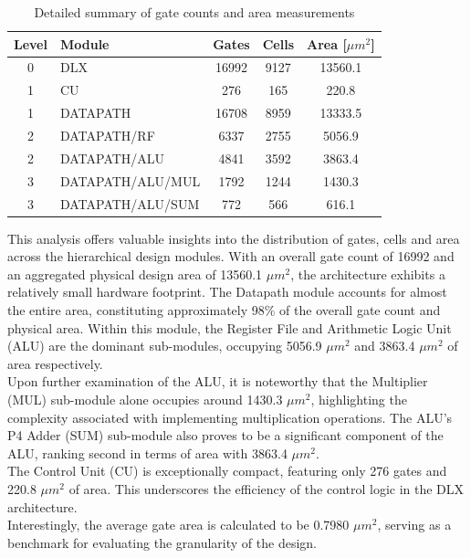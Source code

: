 \begin{table}[!htbp]
	\centering
	\begin{tabular}{clccc}
		\toprule
		Level & Module & Gates & Cells & Area [$\mu m^2$] \\
		\midrule
		0 & DLX & 16992 & 9127 & 13560.1 \\
		1 & CU & 276 & 165 & 220.8 \\
		1 & DATAPATH & 16708 & 8959 & 13333.5 \\
		2 & DATAPATH/RF & 6337 & 2755 & 5056.9 \\
		2 & DATAPATH/ALU & 4841 & 3592 & 3863.4 \\
		3 & DATAPATH/ALU/MUL & 1792 & 1244 & 1430.3 \\
		3 & DATAPATH/ALU/SUM & 772 & 566 & 616.1 \\
		\bottomrule
	\end{tabular}
	\caption{Detailed summary of gate counts and area measurements}
	\label{tab:phy_results}
\end{table}

This analysis offers valuable insights into the distribution of gates, cells and area across the hierarchical design modules. With an overall gate count of 16992 and an aggregated physical design area of 13560.1 $\mu m^2$, the architecture exhibits a relatively small hardware footprint. The Datapath module accounts for almost the entire area, constituting approximately 98\% of the overall gate count and physical area. Within this module, the Register File and Arithmetic Logic Unit (ALU) are the dominant sub-modules, occupying 5056.9 $\mu m^2$ and 3863.4 $\mu m^2$ of area respectively. \\

Upon further examination of the ALU, it is noteworthy that the Multiplier (MUL) sub-module alone occupies around 1430.3 $\mu m^2$, highlighting the complexity associated with implementing multiplication operations. The ALU's P4 Adder (SUM) sub-module also proves to be a significant component of the ALU, ranking second in terms of area with 3863.4 $\mu m^2$. \\

The Control Unit (CU) is exceptionally compact, featuring only 276 gates and 220.8 $\mu m^2$ of area. This underscores the efficiency of the control logic in the DLX architecture. \\

Interestingly, the average gate area is calculated to be 0.7980 $\mu m^2$, serving as a benchmark for evaluating the granularity of the design.

